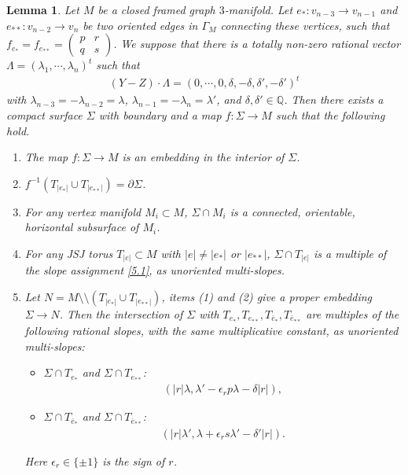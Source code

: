 \documentclass{amsart}
\numberwithin{equation}{section}
\newtheorem{lemma}[theorem]{Lemma}
\theoremstyle{definition}
\begin{document}
\begin{lemma}\label{horizontaladvanced}
Let $M$ be a closed framed graph $3$-manifold. Let $e_*:v_{n-3}\to v_{n-1}$ and $e_{**}:v_{n-2}\to v_n$ be two oriented edges in $\Gamma_M$ connecting these vertices, such that $f_{e_*}=f_{e_{**}}=\begin{pmatrix}
p & r\\
q & s
\end{pmatrix}$.
We suppose that there is a totally non-zero rational vector $\Lambda=(\lambda_1,\cdots,\lambda_n)^t$ such that 
\begin{align}\label{5.4}
(Y-Z)\cdot \Lambda =
(0, \cdots, 0, \delta, -\delta, \delta', -\delta')^t
\end{align}
with $\lambda_{n-3}=-\lambda_{n-2}=\lambda$, $\lambda_{n-1}=-\lambda_n=\lambda'$, and $\delta,\delta'\in \mathbb{Q}$. Then there exists a compact surface $\Sigma$ with boundary and a map $f:\Sigma\to M$ such that the following hold.
\begin{enumerate}
\item The map $f:\Sigma\to M$ is an embedding in the interior of $\Sigma$.
\item $f^{-1}(T_{|e_*|}\cup T_{|e_{**}|})=\partial \Sigma$.
\item For any vertex manifold $M_i\subset M$, $\Sigma\cap M_i$ is a connected, orientable, horizontal subsurface of $M_i$.
\item For any JSJ torus $T_{|e|}\subset M$ with $|e|\ne |e_*|$ or $|e_{**}|$, $\Sigma\cap T_{|e|}$ is a multiple of the slope assignment \eqref{5.1}, as unoriented multi-slopes.
\item Let $N=M\setminus\setminus (T_{|e_*|}\cup T_{|e_{**}|})$, items (1) and (2) give a proper embedding $\Sigma\to N$. Then the intersection of $\Sigma$ with $T_{e_*},T_{e_{**}},T_{\bar{e}_*},T_{\bar{e}_{**}}$ are multiples of the following rational slopes, with the same multiplicative constant, as unoriented multi-slopes:
\begin{itemize}
\item $\Sigma\cap T_{e_*}$ and $\Sigma\cap T_{e_{**}}$: 
\begin{align}\label{5.5}
(|r|\lambda,\lambda'-\epsilon_r p\lambda-\delta|r|),
\end{align}
\item $\Sigma\cap T_{\bar{e}_*}$ and $\Sigma\cap T_{\bar{e}_{**}}$: 
\begin{align}\label{5.6}
(|r|\lambda',\lambda+\epsilon_r s\lambda'-\delta'|r|).
\end{align}
\end{itemize}
Here $\epsilon_r\in \{\pm1\}$ is the sign of $r$.
\end{enumerate}
\end{lemma}
\end{document}

